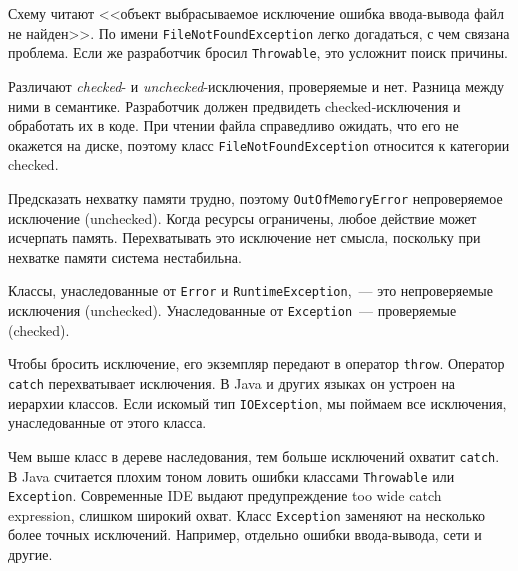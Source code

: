 \linegap

\ifx\devicetype\mobile


\else


\fi

\linegap

\mnoindent
Схему читают <<объект \arr выбрасываемое \arr исключение \arr ошибка
ввода-вывода \arr файл не найден>>. По имени \verb|FileNotFoundException|
легко догадаться, с чем связана проблема. Если же разработчик бросил
\verb|Throwable|, это усложнит поиск причины.

Различают \emph{checked}- и \emph{unchecked}-исключения, проверяемые и
нет. Разница между ними в семантике. Разработчик должен предвидеть checked-исключения и обработать их в коде. При чтении файла справедливо ожидать, что его
не окажется на диске, поэтому класс \verb|FileNotFoundException| относится к
категории checked.


\label{exc-hierarchy}

Предсказать нехватку памяти трудно, поэтому \verb|OutOfMemoryError|
непроверяемое исключение (unchecked). Когда ресурсы ограничены, любое действие
может исчерпать память. Перехватывать это исключение нет смысла, поскольку при
нехватке памяти система нестабильна.


Классы, унаследованные от \verb|Error| и \texttt{Runtime\-Exception},~--- это
непроверяемые исключения (unchecked). Унаследованные от \verb|Exception|~---
проверяемые (checked).


Чтобы бросить исключение, его экземпляр передают в оператор
\verb|throw|. Оператор \verb|catch| перехватывает исключения. В Java и
других языках он устроен на иерархии классов. Если искомый тип
\verb|IOException|, мы поймаем все исключения, унаследованные от этого класса.

Чем выше класс в дереве наследования, тем больше исключений охватит
\verb|catch|. В Java считается плохим тоном ловить ошибки классами
\verb|Throwable| или \verb|Exception|. Современные IDE выдают предупреждение
too wide catch expression, слишком широкий охват. Класс \verb|Exception|
заменяют на несколько более точных исключений. Например, отдельно ошибки
ввода-вывода, сети и другие.

